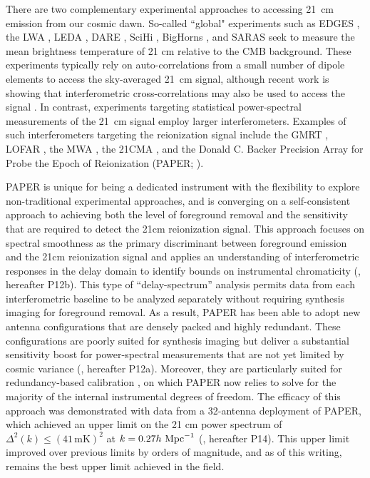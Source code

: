 \documentclass[twocolumn,numberedappendix]{emulateapj} \shorttitle{PSA64}
\newcommand{\hMpci}{h\ {\rm Mpc}^{-1}}
\begin{document}
There are two complementary experimental approaches to accessing 21~cm emission from
our cosmic dawn.  So-called ``global" experiments such as 
EDGES \citep{bowman_et_al2010}, 
the LWA \citep{ellingson_et_al2013},
LEDA \citep{greenhill_bernardi2012,bernardi_et_al2015}, 
DARE \citep{burns_et_al2012}, 
SciHi \citep{tabitha_et_al2014}, 
BigHorns \citep{sokolowski_et_al2015},
and SARAS \citep{patra_et_al2015} 
seek to measure the
mean brightness temperature of 21 cm relative to the CMB background. These experiments
typically rely on auto-correlations from a small number of dipole elements to access
the sky-averaged 21~cm signal, although recent work is showing
that interferometric cross-correlations may also be used to access the signal
\citep{presley_et_al2015,vedantham_et_al2015}.
In contrast, experiments targeting statistical power-spectral measurements of the 21~cm
signal employ larger interferometers.  Examples of such interferometers targeting
the reionization signal include
the GMRT \citep{paciga_et_al2013},
LOFAR \citep{van_haarlem_et_al2013},
the MWA \citep{tingay_et_al2013},
the 21CMA \citep{peterson_et_al2004,wu2009},
and the Donald C. Backer Precision Array for Probe the Epoch of Reionization (PAPER; \citealt{parsons_et_al2010}). 

PAPER is unique for being a dedicated instrument with the flexibility
to explore non-traditional experimental approaches, and is converging on a self-consistent
approach to achieving both the level of foreground removal and the sensitivity that are required 
to detect the 21cm reionization signal.  This approach focuses on spectral smoothness as the primary
discriminant between foreground emission and the 21cm reionization signal  and applies an understanding
of interferometric responses in the delay domain to identify bounds on instrumental chromaticity 
(\citealt{parsons_et_al2012b}, hereafter P12b).  This type of ``delay-spectrum'' analysis permits data from each 
interferometric baseline
to be analyzed separately without requiring synthesis imaging for foreground removal.  As a result, PAPER has
been able to adopt new antenna configurations that are densely packed and highly redundant.
These configurations are poorly suited for synthesis imaging but
deliver a substantial sensitivity boost for power-spectral measurements that are not yet limited by
cosmic variance (\citealt{parsons_et_al2012a}, hereafter P12a).  Moreover, they are particularly suited
for redundancy-based calibration \citep{liu_et_al2010,wieringa1992,zheng_et_al2014}, on which PAPER
now relies to solve for the majority of the internal instrumental degrees of freedom.  The efficacy of
this approach was demonstrated with 
data from a 32-antenna deployment of PAPER, which achieved an upper 
limit on the 21 cm power spectrum of $\Delta^2 (k) \leq (41\,\textrm{mK})^{2}$ at 
$k=0.27\hMpci$ (\citealt{parsons_et_al2014}, hereafter P14).  This upper limit improved
over previous limits by orders of magnitude, and as of this writing, remains the best
upper limit achieved in the field.
\end{document}

